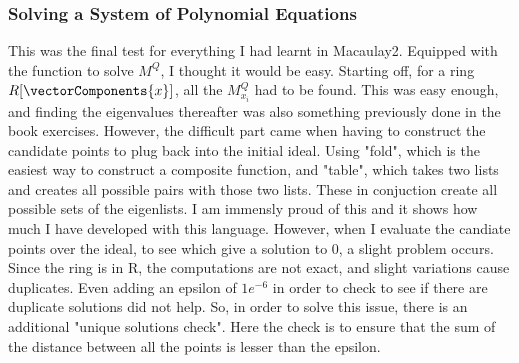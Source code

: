 \subsubsection{Solving a System of Polynomial Equations}
This was the final test for everything I had learnt in Macaulay2. Equipped with the function to solve $M^Q$, I thought it would be easy. Starting off, for a ring $R[\vectorComponents{x}]$, all the $M_{x_i}^Q$ had to be found. This was easy enough, and finding the eigenvalues thereafter was also something previously done in the book exercises. However, the difficult part came when having to construct the candidate points to plug back into the initial ideal. Using "fold", which is the easiest way to construct a composite function, and "table", which takes two lists and creates all possible pairs with those two lists. These in conjuction create all possible sets of the eigenlists. I am immensly proud of this and it shows how much I have developed with this language. However, when I evaluate the candiate points over the ideal, to see which give a solution to 0, a slight problem occurs. Since the ring is in R, the computations are not exact, and slight variations cause duplicates. Even adding an epsilon of $1e^{-6}$ in order to check to see if there are duplicate solutions did not help. So, in order to solve this issue, there is an additional "unique solutions check". Here the check is to ensure that the sum of the distance between all the points is lesser than the epsilon.
